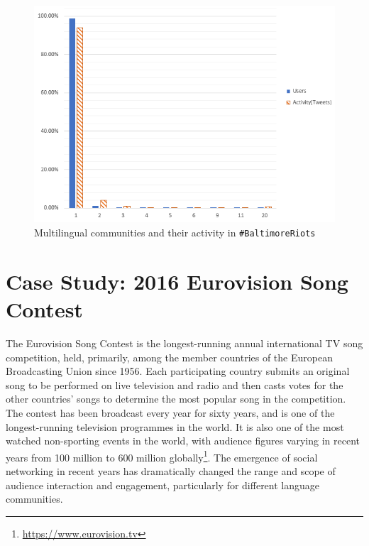 \documentclass{llncs}
\begin{document}
\begin{figure}
\centering
\includegraphics[width=\columnwidth]{images/baltimore_multilingual.png}
\caption{Multilingual communities and their activity in {\texttt{\#BaltimoreRiots}}}
\label{fig:baltimore_multilingual}
\end{figure}


\section{Case Study: 2016 Eurovision Song Contest}\label{eurovisioncasestudy}

The Eurovision Song Contest is the longest-running annual
international TV song competition, held, primarily, among the member
countries of the European Broadcasting Union since 1956. Each
participating country submits an original song to be performed on live
television and radio and then casts votes for the other countries'
songs to determine the most popular song in the competition. The
contest has been broadcast every year for sixty years, and is one of
the longest-running television programmes in the world. It is also one
of the most watched non-sporting events in the world, with audience
figures varying in recent years from 100 million to 600 million
globally\footnote{\url{https://www.eurovision.tv}}. The emergence of
social networking in recent years has dramatically changed the range
and scope of audience interaction and engagement, particularly for
different language communities.
\end{document}
